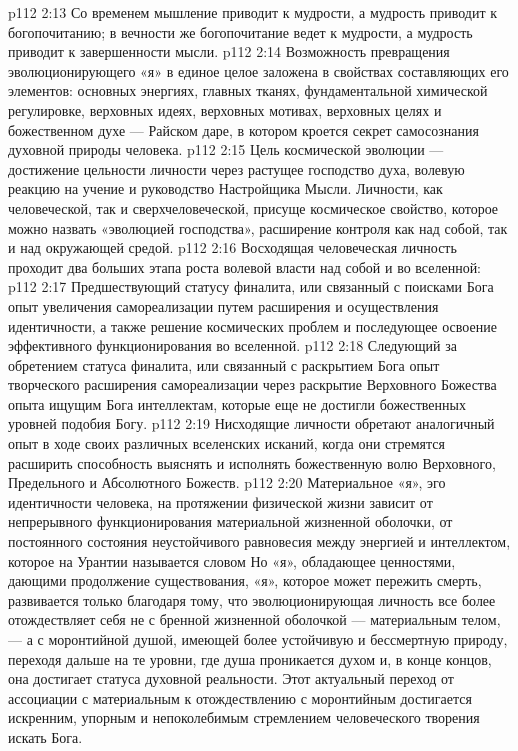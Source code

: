 \vs p112 2:13 Со временем мышление приводит к мудрости, а мудрость приводит к богопочитанию; в вечности же богопочитание ведет к мудрости, а мудрость приводит к завершенности мысли.
\vs p112 2:14 Возможность превращения эволюционирующего «я» в единое целое заложена в свойствах составляющих его элементов: основных энергиях, главных тканях, фундаментальной химической регулировке, верховных идеях, верховных мотивах, верховных целях и божественном духе --- Райском даре, в котором кроется секрет самосознания духовной природы человека.
\vs p112 2:15 Цель космической эволюции --- достижение цельности личности через растущее господство духа, волевую реакцию на учение и руководство Настройщика Мысли. Личности, как человеческой, так и сверхчеловеческой, присуще космическое свойство, которое можно назвать «эволюцией господства», расширение контроля как над собой, так и над окружающей средой.
\vs p112 2:16 \pc Восходящая человеческая личность проходит два больших этапа роста волевой власти над собой и во вселенной:
\vs p112 2:17 \bibnobreakspace Предшествующий статусу финалита, или связанный с поисками Бога опыт увеличения самореализации путем расширения и осуществления идентичности, а также решение космических проблем и последующее освоение эффективного функционирования во вселенной.
\vs p112 2:18 \bibnobreakspace Следующий за обретением статуса финалита, или связанный с раскрытием Бога опыт творческого расширения самореализации через раскрытие Верховного Божества опыта ищущим Бога интеллектам, которые еще не достигли божественных уровней подобия Богу.
\vs p112 2:19 \pc Нисходящие личности обретают аналогичный опыт в ходе своих различных вселенских исканий, когда они стремятся расширить способность выяснять и исполнять божественную волю Верховного, Предельного и Абсолютного Божеств.
\vs p112 2:20 \pc Материальное «я», эго идентичности человека, на протяжении физической жизни зависит от непрерывного функционирования материальной жизненной оболочки, от постоянного состояния неустойчивого равновесия между энергией и интеллектом, которое на Урантии называется словом  Но «я», обладающее ценностями, дающими продолжение существования, «я», которое может пережить смерть, развивается только благодаря тому, что эволюционирующая личность все более отождествляет себя не с бренной жизненной оболочкой --- материальным телом, --- а с моронтийной душой, имеющей более устойчивую и бессмертную природу, переходя дальше на те уровни, где душа проникается духом и, в конце концов, она достигает статуса духовной реальности. Этот актуальный переход от ассоциации с материальным к отождествлению с моронтийным достигается искренним, упорным и непоколебимым стремлением человеческого творения искать Бога.
